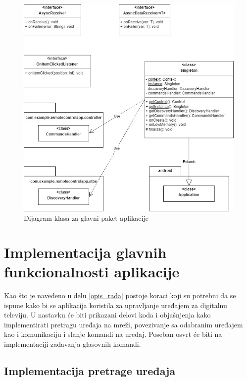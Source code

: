 \documentclass[implementacija.tex]{subfiles}
\begin{document}
\begin{figure}[!ht]
  \centering
  \includegraphics[width=\textwidth]{Implementacija/dijagrami/app_root_package.jpg}
  \caption{Dijagram klasa za glavni paket aplikacije}
  \label{fig:dijagramRoot}
\end{figure}

\section{Implementacija glavnih funkcionalnosti aplikacije}
Kao što je navedeno u delu \ref{opis_rada} postoje koraci koji su potrebni da se ispune kako bi se aplikacija koristila za upravljanje uređajem za digitalnu televiju. U nastavku će biti prikazani delovi koda i objašnjenja kako implementirati pretragu uređaja na mreži, povezivanje sa odabranim uređajem kao i komunikaciju i slanje komandi na uređaj. Poseban osvrt će biti na implementaciji zadavanja glasovnih komandi. 

\subsection{Implementacija pretrage uređaja}

\end{document}
